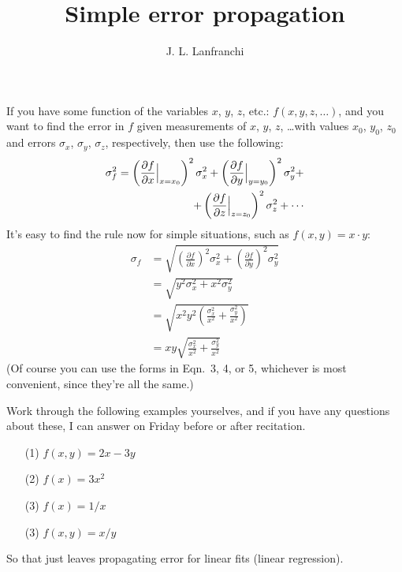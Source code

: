 \documentclass[10pt,letterpaper,twoside]{article}
\author{J. L. Lanfranchi}
\title{Simple error propagation}
\begin{document}
 
\twocolumn
\maketitle
If you have some function of the variables $x$, $y$, $z$, etc.: $f(x,y,z,\dots)$, and you want to find the error in $f$ given measurements of $x$, $y$, $z$, \dots with values $x_0$, $y_0$, $z_0$ and errors $\sigma_x$, $\sigma_y$, $\sigma_z$, respectively, then use the following:
\begin{align}
  \sigma_f^2 = \left(\frac{\partial f}{\partial x}\Big|_{x=x_0}\right)^2\sigma_x^2 +
  \left(\frac{\partial f}{\partial y}\Big|_{y=y_0}\right)^2\sigma_y^2 + \\
   + \left(\frac{\partial f}{\partial z}\Big|_{z=z_0}\right)^2\sigma_z^2 + \cdots \notag
\end{align}
It's easy to find the rule now for simple situations, such as $f(x,y)=x\cdot y$:
\begin{align}
  \sigma_f &= \sqrt{\left(\frac{\partial f}{\partial x}\right)^2\sigma_x^2 +
  \left(\frac{\partial f}{\partial y}\right)^2\sigma_y^2 } \\
   &= \sqrt{y^2\sigma_x^2 + x^2\sigma_y^2 } \\
   &= \sqrt{x^2y^2\left( \frac{\sigma_x^2}{x^2} + \frac{\sigma_y^2}{x^2}\right) }\\
   &= xy \sqrt{ \frac{\sigma_x^2}{x^2} + \frac{\sigma_y^2}{x^2} }
\end{align}
(Of course you can use the forms in Eqn.~3, 4, or 5, whichever is most convenient, since they're all the same.)

Work through the following examples yourselves, and if you have any questions about these, I can answer on Friday before or after recitation.
\begin{itemize}
  \item[(1)] $f(x,y)=2x-3y$ \\
  \item[(2)] $f(x)=3x^2$ \\
  \item[(3)] $f(x)=1/x$ \\
  \item[(3)] $f(x,y)=x/y$ 
\end{itemize}

So that just leaves propagating error for linear fits (linear regression). 
\end{document}
